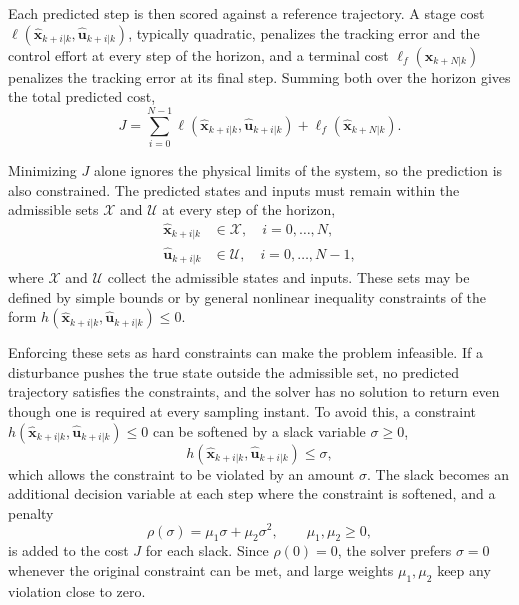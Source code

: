 Each predicted step is then scored against a reference trajectory. A stage cost $\ell(\hat{\mathbf{x}}_{k+i|k}, \hat{\mathbf{u}}_{k+i|k})$, typically quadratic, penalizes the tracking error and the control effort at every step of the horizon, and a terminal cost $\ell_f(\hat{\mathbf{x}}_{k+N|k})$ penalizes the tracking error at its final step. Summing both over the horizon gives the total predicted cost,
\begin{equation}
    J = \sum_{i=0}^{N-1} \ell\left( \hat{\mathbf{x}}_{k+i|k}, \hat{\mathbf{u}}_{k+i|k} \right) + \ell_f\left( \hat{\mathbf{x}}_{k+N|k} \right).
    \label{eq:nmpc_cost}
\end{equation}

Minimizing $J$ alone ignores the physical limits of the system, so the prediction is also constrained. The predicted states and inputs must remain within the admissible sets $\mathcal{X}$ and $\mathcal{U}$ at every step of the horizon,
\begin{align}
    \hat{\mathbf{x}}_{k+i|k} &\in \mathcal{X}, \quad i = 0, \dots, N, \label{eq:nmpc_bounds_x} \\
    \hat{\mathbf{u}}_{k+i|k} &\in \mathcal{U}, \quad i = 0, \dots, N-1, \label{eq:nmpc_bounds_u}
\end{align}
where $\mathcal{X}$ and $\mathcal{U}$ collect the admissible states and inputs. These sets may be defined by simple bounds or by general nonlinear inequality constraints of the form $h(\hat{\mathbf{x}}_{k+i|k}, \hat{\mathbf{u}}_{k+i|k}) \le 0$.

Enforcing these sets as hard constraints can make the problem infeasible. If a disturbance pushes the true state outside the admissible set, no predicted trajectory satisfies the constraints, and the solver has no solution to return even though one is required at every sampling instant. To avoid this, a constraint $h(\hat{\mathbf{x}}_{k+i|k}, \hat{\mathbf{u}}_{k+i|k}) \le 0$ can be softened by a slack variable $\sigma \ge 0$,
\begin{equation}
    h(\hat{\mathbf{x}}_{k+i|k}, \hat{\mathbf{u}}_{k+i|k}) \le \sigma,
    \label{eq:nmpc_soft_constraint}
\end{equation}
which allows the constraint to be violated by an amount $\sigma$. The slack becomes an additional decision variable at each step where the constraint is softened, and a penalty
\begin{equation}
    \rho(\sigma) = \mu_{1}\sigma + \mu_{2}\sigma^2, \qquad \mu_{1}, \mu_{2} \ge 0,
    \label{eq:nmpc_slack_penalty}
\end{equation}
is added to the cost $J$ for each slack. Since $\rho(0) = 0$, the solver prefers $\sigma = 0$ whenever the original constraint can be met, and large weights $\mu_1, \mu_2$ keep any violation close to zero.

